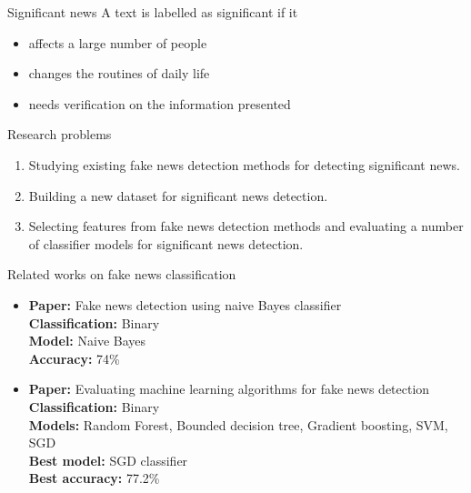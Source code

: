 \documentclass[12pt]{beamer}
\begin{document}
\begin{frame}{Significant news}
    A text is labelled as significant if it \\
    \begin{itemize}
        \item affects a large number of people
        \item changes the routines of daily life
        \item needs verification on the information presented
    \end{itemize}
\end{frame}

\begin{frame}{Research problems}
    \begin{enumerate}
        \item Studying existing fake news detection methods for detecting significant news.
        \item Building a new dataset for significant news detection.
        \item Selecting features from fake news detection methods and evaluating a number of classifier models for significant news detection.
    \end{enumerate}
\end{frame}

\begin{frame}{Related works on fake news classification}
    \begin{itemize}
        \item
        \textbf{Paper:} Fake news detection using naive Bayes classifier \\
        \textbf{Classification:} Binary \\
        \textbf{Model:} Naive Bayes \\
        \textbf{Accuracy:} 74\% \\

        \item
        \textbf{Paper:} Evaluating machine learning algorithms for fake news detection \\
        \textbf{Classification:} Binary \\
        \textbf{Models:} Random Forest, Bounded decision tree, Gradient boosting, SVM, SGD \\
        \textbf{Best model:} SGD classifier\\
        \textbf{Best accuracy:} 77.2\% \\
    \end{itemize}
\end{frame}
\end{document}
